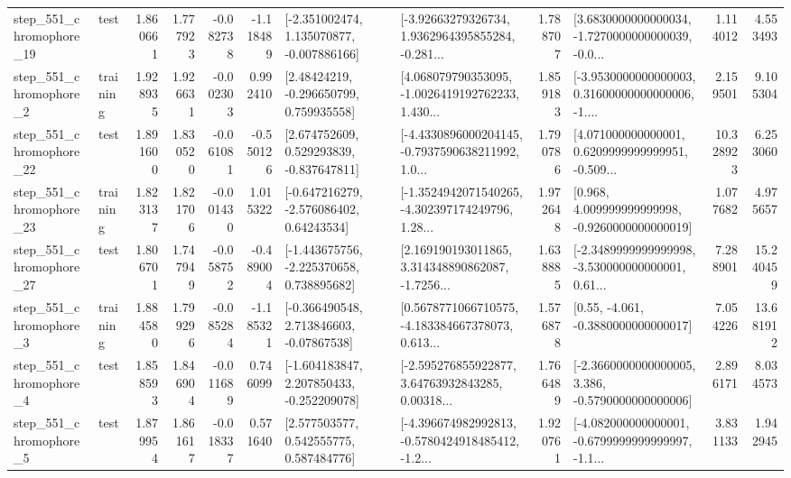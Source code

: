 \begin{tabular}{llrrrrllrlrr}
  step\_551\_chromophore\_19 &      test &      1.860661 &    1.777923 &     -0.082738 & -1.118489 &   [-2.351002474, 1.135070877, -0.007886166] &  [-3.92663279326734, 1.9362964395855284, -0.281... &       1.788707 &  [3.6830000000000034, -1.7270000000000039, -0.0... &            1.114012 &          4.553493 \\
   step\_551\_chromophore\_2 &  training &      1.928935 &    1.926631 &     -0.002303 &  0.992410 &     [2.48424219, -0.296650799, 0.759935558] &  [4.068079790353095, -1.0026419192762233, 1.430... &       1.859183 &  [-3.9530000000000003, 0.31600000000000006, -1.... &            2.159501 &          9.105304 \\
  step\_551\_chromophore\_22 &      test &      1.891600 &    1.830520 &     -0.061081 & -0.550126 &    [2.674752609, 0.529293839, -0.837647811] &  [-4.4330896000204145, -0.7937590638211992, 1.0... &       1.790786 &  [4.071000000000001, 0.6209999999999951, -0.509... &           10.328923 &          6.253060 \\
  step\_551\_chromophore\_23 &  training &      1.823137 &    1.821706 &     -0.001430 &  1.015322 &    [-0.647216279, -2.576086402, 0.64243534] &  [-1.3524942071540265, -4.302397174249796, 1.28... &       1.972648 &    [0.968, 4.009999999999998, -0.9260000000000019] &            1.077682 &          4.975657 \\
  step\_551\_chromophore\_27 &      test &      1.806701 &    1.747949 &     -0.058752 & -0.489004 &   [-1.443675756, -2.225370658, 0.738895682] &  [2.169190193011865, 3.314348890862087, -1.7256... &       1.638885 &  [-2.3489999999999998, -3.530000000000001, 0.61... &            7.288901 &         15.240459 \\
   step\_551\_chromophore\_3 &  training &      1.884580 &    1.799296 &     -0.085284 & -1.185321 &    [-0.366490548, 2.713846603, -0.07867538] &  [0.5678771066710575, -4.183384667378073, 0.613... &       1.576878 &                [0.55, -4.061, -0.3880000000000017] &            7.054226 &         13.681912 \\
   step\_551\_chromophore\_4 &      test &      1.858593 &    1.846904 &     -0.011689 &  0.746099 &   [-1.604183847, 2.207850433, -0.252209078] &  [-2.595276855922877, 3.64763932843285, 0.00318... &       1.766489 &  [-2.3660000000000005, 3.386, -0.5790000000000006] &            2.896171 &          8.034573 \\
   step\_551\_chromophore\_5 &      test &      1.879954 &    1.861617 &     -0.018337 &  0.571640 &     [2.577503577, 0.542555775, 0.587484776] &  [-4.396674982992813, -0.5780424918485412, -1.2... &       1.920761 &  [-4.082000000000001, -0.6799999999999997, -1.1... &            3.831133 &          1.942945 \\

\end{tabular}
